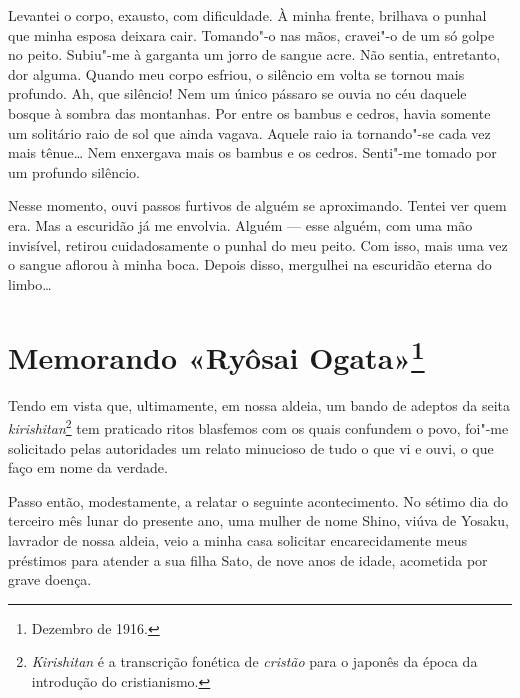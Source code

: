Levantei o corpo, exausto, com dificuldade. À minha frente, brilhava o
punhal que minha esposa deixara cair. Tomando"-o nas mãos, cravei"-o de
um só golpe no peito. Subiu"-me à garganta um jorro de sangue acre. Não
sentia, entretanto, dor alguma. Quando meu corpo esfriou, o silêncio em
volta se tornou mais profundo. Ah, que silêncio! Nem um único pássaro
se ouvia no céu daquele bosque à sombra das montanhas. Por entre os
bambus e cedros, havia somente um solitário raio de sol que ainda
vagava. Aquele raio ia tornando"-se cada vez mais tênue\ldots{} Nem enxergava
mais os bambus e os cedros. Senti"-me tomado por um profundo silêncio.

Nesse momento, ouvi passos furtivos de alguém se aproximando. Tentei
ver quem era. Mas a escuridão já me envolvia. Alguém --- esse alguém, com
uma mão invisível, retirou cuidadosamente o punhal do meu peito. Com
isso, mais uma vez o sangue aflorou à minha boca. Depois disso,
mergulhei na escuridão eterna do limbo\ldots{}

\chapter{Memorando «Ryôsai Ogata»\footnote{Dezembro de 1916.}}

\noindent{}Tendo em vista que, ultimamente, em nossa aldeia, um bando de adeptos da
seita \textit{kirishitan}\footnote{ \textit{Kirishitan} é a transcrição
fonética de \textit{cristão} para o japonês da época da
introdução do cristianismo.} tem praticado ritos blasfemos com os quais 
confundem o povo, foi"-me solicitado pelas autoridades um
relato minucioso de tudo o que vi e ouvi, o que faço em nome da verdade.

Passo então, modestamente, a relatar o seguinte acontecimento. No sétimo
dia do terceiro mês lunar do presente ano, uma mulher de nome Shino,
viúva de Yosaku, lavrador de nossa aldeia, veio a minha casa solicitar
encarecidamente meus préstimos para atender a sua filha Sato, de nove
anos de idade, acometida por grave doença.

